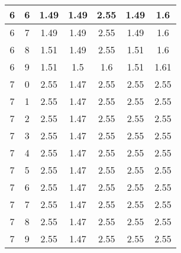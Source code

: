 \begin{longtable}{|c|c||c||c|c||c|c|}
	6 & 6 & 1.49 & 1.49 & 2.55 & 1.49 & 1.6 \\ \hline
	6 & 7 & 1.49 & 1.49 & 2.55 & 1.49 & 1.6 \\ \hline
	6 & 8 & 1.51 & 1.49 & 2.55 & 1.51 & 1.6 \\ \hline
	6 & 9 & 1.51 & 1.5 & 1.6 & 1.51 & 1.61 \\ \hline
	7 & 0 & 2.55 & 1.47 & 2.55 & 2.55 & 2.55 \\ \hline
	7 & 1 & 2.55 & 1.47 & 2.55 & 2.55 & 2.55 \\ \hline
	7 & 2 & 2.55 & 1.47 & 2.55 & 2.55 & 2.55 \\ \hline
	7 & 3 & 2.55 & 1.47 & 2.55 & 2.55 & 2.55 \\ \hline
	7 & 4 & 2.55 & 1.47 & 2.55 & 2.55 & 2.55 \\ \hline
	7 & 5 & 2.55 & 1.47 & 2.55 & 2.55 & 2.55 \\ \hline
	7 & 6 & 2.55 & 1.47 & 2.55 & 2.55 & 2.55 \\ \hline
	7 & 7 & 2.55 & 1.47 & 2.55 & 2.55 & 2.55 \\ \hline
	7 & 8 & 2.55 & 1.47 & 2.55 & 2.55 & 2.55 \\ \hline
	7 & 9 & 2.55 & 1.47 & 2.55 & 2.55 & 2.55 \\ \hline
\end{longtable}
\clearpage{}
